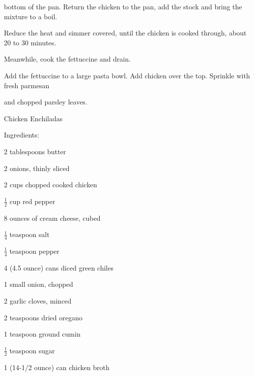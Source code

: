 \documentclass[a4paper,portrait,12pt]{book}
\begin{document}
bottom of the pan. Return the chicken to the pan, add the stock and bring the mixture to a boil.




Reduce the heat and simmer covered, until the chicken is cooked through, about 20 to 30 minutes.




Meanwhile, cook the fettuccine and drain.




Add the fettuccine to a large pasta bowl. Add chicken over the top. Sprinkle with fresh parmesan




and chopped parsley leaves.







\newpage
Chicken Enchiladas




Ingredients:




2 tablespoons butter




2 onions, thinly sliced




2 cups chopped cooked chicken




$\frac{1}{2}$ cup red pepper




8 ounces of cream cheese, cubed




$\frac{1}{4}$ teaspoon salt




$\frac{1}{4}$ teaspoon pepper




4 (4.5 ounce) cans diced green chiles




1 small onion, chopped




2 garlic cloves, minced




2 teaspoons dried oregano




1 teaspoon ground cumin




$\frac{1}{2}$ teaspoon sugar




1 (14-1/2 ounce) can chicken broth
\end{document}
